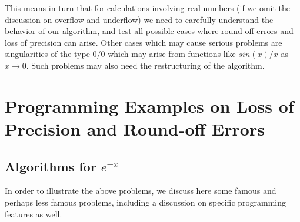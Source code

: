 This means in turn that for calculations involving real numbers (if we omit the discussion on overflow
and underflow) we need to carefully understand the behavior of our algorithm, and test
all possible cases where round-off errors and loss of precision can arise.  
%
Other cases which may cause serious problems are singularities of the 
type $0/0$ which may arise from functions like $sin(x)/x$ as
$x\rightarrow 0$. Such problems may also need the restructuring
of the algorithm.

\section{Programming Examples on Loss of Precision and Round-off Errors}

\subsection{Algorithms for $e^{-x}$}
In order to illustrate the above problems, we discuss here some famous and perhaps less famous
problems, including a discussion on specific  programming features as well. 

